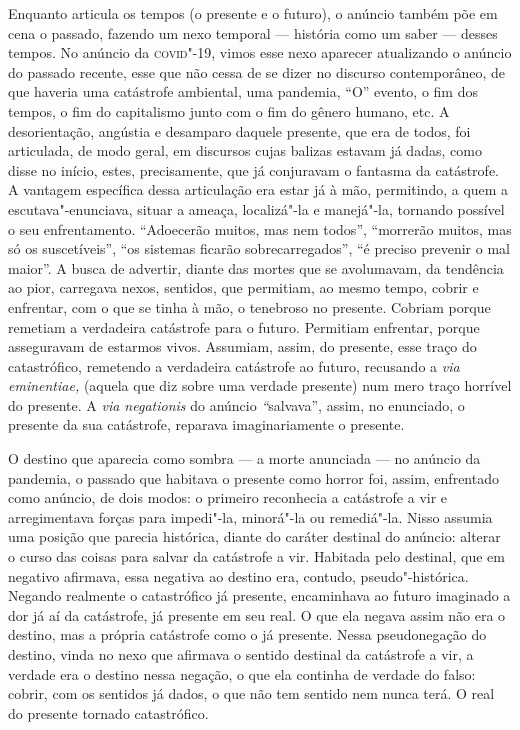 Enquanto articula os tempos (o presente e o futuro), o anúncio também
põe em cena o passado, fazendo um nexo temporal --- história como um
saber --- desses tempos. No anúncio da \textsc{covid}"-19, vimos esse nexo
aparecer atualizando o anúncio do passado recente, esse que não cessa de
se dizer no discurso contemporâneo, de que haveria uma catástrofe
ambiental, uma pandemia, ``O'' evento, o fim dos tempos, o fim do
capitalismo junto com o fim do gênero humano, etc. A desorientação,
angústia e desamparo daquele presente, que era de todos, foi articulada,
de modo geral, em discursos cujas balizas estavam já dadas, como disse
no início, estes, precisamente, que já conjuravam o fantasma da
catástrofe. A vantagem específica dessa articulação era estar já à mão,
permitindo, a quem a escutava"-enunciava, situar a ameaça, localizá"-la e
manejá"-la, tornando possível o seu enfrentamento. ``Adoecerão muitos,
mas nem todos'', ``morrerão muitos, mas só os suscetíveis'', ``os
sistemas ficarão sobrecarregados'', ``é preciso prevenir o mal maior''.
A busca de advertir, diante das mortes que se avolumavam, da tendência
ao pior, carregava nexos, sentidos, que permitiam, ao mesmo tempo,
cobrir e enfrentar, com o que se tinha à mão, o tenebroso no presente.
Cobriam porque remetiam a verdadeira catástrofe para o futuro. Permitiam
enfrentar, porque asseguravam de estarmos vivos. Assumiam, assim, do
presente, esse traço do catastrófico, remetendo a verdadeira catástrofe
ao futuro, recusando a \emph{via} \emph{eminentiae,} (aquela que diz
sobre uma verdade presente) num mero traço horrível do presente. A
\emph{via negationis} do anúncio \emph{``}salvava'', assim, no
enunciado, o presente da sua catástrofe, reparava imaginariamente o
presente.

O destino que aparecia como sombra --- a morte anunciada --- no anúncio
da pandemia, o passado que habitava o presente como horror foi, assim,
enfrentado como anúncio, de dois modos: o primeiro reconhecia a
catástrofe a vir e arregimentava forças para impedi"-la, minorá"-la ou
remediá"-la. Nisso assumia uma posição que parecia histórica, diante do
caráter destinal do anúncio: alterar o curso das coisas para salvar da
catástrofe a vir. Habitada pelo destinal, que em negativo afirmava, essa
negativa ao destino era, contudo, pseudo"-histórica. Negando realmente o
catastrófico já presente, encaminhava ao futuro imaginado a dor já aí da
catástrofe, já presente em seu real. O que ela negava assim não era o
destino, mas a própria catástrofe como o já presente. Nessa
pseudonegação do destino, vinda no nexo que afirmava o sentido destinal
da catástrofe a vir, a verdade era o destino nessa negação, o que ela
continha de verdade do falso: cobrir, com os sentidos já dados, o que
não tem sentido nem nunca terá. O real do presente tornado catastrófico.

